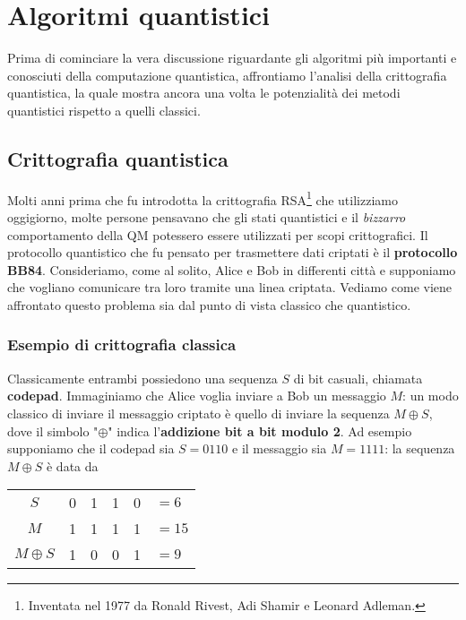 \chapter{Algoritmi quantistici}

\vspace{1cm}


\vspace{0.5cm}

\noindent Prima di cominciare la vera discussione riguardante gli algoritmi più importanti e conosciuti della computazione quantistica, affrontiamo l'analisi della crittografia quantistica, la quale mostra ancora una volta le potenzialità dei metodi quantistici rispetto a quelli classici. 

\section{Crittografia quantistica}
Molti anni prima che fu introdotta la crittografia RSA\footnote{Inventata nel 1977 da Ronald Rivest, Adi Shamir e Leonard Adleman.} che utilizziamo oggigiorno, molte persone pensavano che gli stati quantistici e il \textit{bizzarro} comportamento della QM potessero essere utilizzati per scopi crittografici. Il protocollo quantistico che fu pensato per trasmettere dati criptati è il \textbf{protocollo BB84}. Consideriamo, come al solito, Alice e Bob in differenti città e supponiamo che vogliano comunicare tra loro tramite una linea criptata. Vediamo come viene affrontato questo problema sia dal punto di vista classico che quantistico. 

\subsection{Esempio di crittografia classica}
Classicamente entrambi possiedono una sequenza $S$ di bit casuali, chiamata \textbf{codepad}. Immaginiamo che Alice voglia inviare a Bob un messaggio $M$: un modo classico di inviare il messaggio criptato è quello di inviare la sequenza $M \oplus S$, dove il simbolo "$\oplus$" indica l'\textbf{addizione bit a bit modulo 2}. Ad esempio supponiamo che il codepad sia $S = 0110$ e il messaggio sia $M = 1111$: la sequenza $M \oplus S$ è data da 
\begin{table}[!ht]
	\centering
    \begin{tabular}{c|cccc|l}
        \toprule
        $S$ & 0 & 1 & 1 & 0 & $= 6$ \\
        $M$ & 1 & 1 & 1 & 1 & $=15$ \\
        \midrule
        $M \oplus S$ & 1 & 0 & 0 & 1 & $=9$ \\
        \bottomrule
    \end{tabular}
\end{table}


